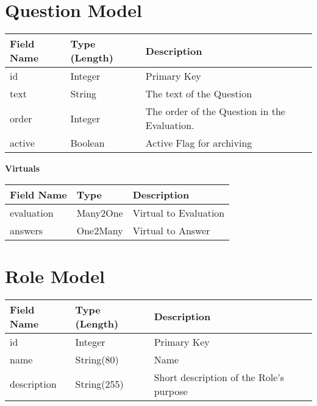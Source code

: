 \documentclass[letterpaper,10pt,english]{sphinxmanual}
\begin{document}
\section{Question Model}
\label{dev-models:qeustion-model-label}\label{dev-models:question-model}
\begin{tabulary}{\linewidth}{|L|L|L|}
\hline
\textsf{\relax 
Field Name
} & \textsf{\relax 
Type (Length)
} & \textsf{\relax 
Description
}\\
\hline
id
 & 
Integer
 & 
Primary Key
\\

text
 & 
String
 & 
The text of the Question
\\

order
 & 
Integer
 & 
The order of the Question in the
Evaluation.
\\

active
 & 
Boolean
 & 
Active Flag for archiving
\\
\hline\end{tabulary}


\textbf{Virtuals}

\begin{tabulary}{\linewidth}{|L|L|L|}
\hline
\textsf{\relax 
Field Name
} & \textsf{\relax 
Type
} & \textsf{\relax 
Description
}\\
\hline
evaluation
 & 
Many2One
 & 
Virtual to Evaluation
\\

answers
 & 
One2Many
 & 
Virtual to Answer
\\
\hline\end{tabulary}



\section{Role Model}
\label{dev-models:role-model-label}\label{dev-models:role-model}
\begin{tabulary}{\linewidth}{|L|L|L|}
\hline
\textsf{\relax 
Field Name
} & \textsf{\relax 
Type (Length)
} & \textsf{\relax 
Description
}\\
\hline
id
 & 
Integer
 & 
Primary Key
\\

name
 & 
String(80)
 & 
Name
\\

description
 & 
String(255)
 & 
Short description of the Role's purpose
\\
\hline\end{tabulary}
\end{document}
